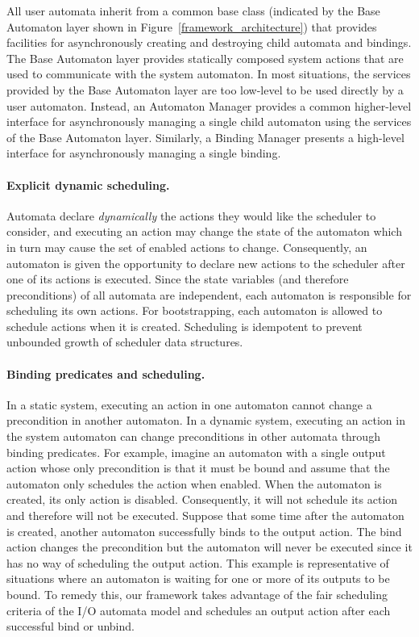 All user automata inherit from a common base class (indicated by the Base Automaton layer shown in Figure~\ref{framework_architecture}) that provides facilities for asynchronously creating and destroying child automata and bindings.
The Base Automaton layer provides statically composed system actions that are used to communicate with the system automaton.
In most situations, the services provided by the Base Automaton layer are too low-level to be used directly by a user automaton.
Instead, an Automaton Manager provides a common higher-level interface for asynchronously managing a single child automaton using the services of the Base Automaton layer.
Similarly, a Binding Manager presents a high-level interface for asynchronously managing a single binding.

\paragraph*{Explicit dynamic scheduling.}
Automata declare \emph{dynamically} the actions they would like the scheduler to consider, and executing an action may change the state of the automaton which in turn may cause the set of enabled actions to change.
Consequently, an automaton is given the opportunity to declare new actions to the scheduler after one of its actions is executed.
Since the state variables (and therefore preconditions) of all automata are independent, each automaton is responsible for scheduling its own actions.
For bootstrapping, each automaton is allowed to schedule actions when it is created.
Scheduling is idempotent to prevent unbounded growth of scheduler data structures.

\paragraph*{Binding predicates and scheduling.}
In a static system, executing an action in one automaton cannot change a precondition in another automaton.
In a dynamic system, executing an action in the system automaton can change preconditions in other automata through binding predicates.
For example, imagine an automaton with a single output action whose only precondition is that it must be bound and assume that the automaton only schedules the action when enabled.
When the automaton is created, its only action is disabled.
Consequently, it will not schedule its action and therefore will not be executed.
Suppose that some time after the automaton is created, another automaton successfully binds to the output action.
The bind action changes the precondition but the automaton will never be executed since it has no way of scheduling the output action.
This example is representative of situations where an automaton is waiting for one or more of its outputs to be bound.
To remedy this, our framework takes advantage of the fair scheduling criteria of the I/O automata model and schedules an output action after each successful bind or unbind.

